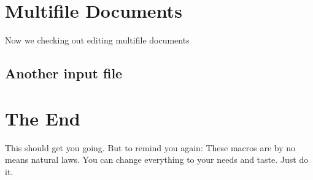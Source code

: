 \section{Multifile Documents}

Now we checking out editing multifile documents

\subsection{Another input file}



\section{The End}
This should get you going. But to remind you again: These macros are by no means natural laws. You can change everything to your needs and taste. Just do it.

